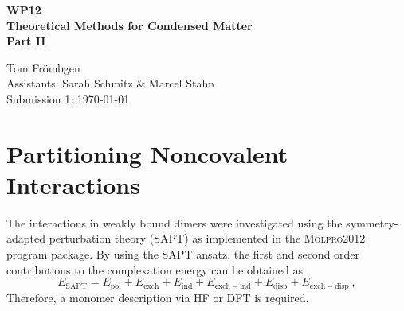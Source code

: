 \documentclass[a4paper,12pt]{scrartcl}
\newcommand{\m}[1]{\mathrm{#1}}
\begin{document}
%
\thispagestyle{empty}

%
\begin{center}
	\begin{LARGE}
		\vspace{50mm}
		\textbf{WP12} \\
		\vspace{15mm}
		\textbf{Theoretical Methods for Condensed Matter} \\
		\vspace{15mm}
		\textbf{Part II} \\
		\vspace{30mm}
	\end{LARGE}
	\begin{large}
		Tom Frömbgen \\
		\vspace{20mm}
		Assistants: Sarah Schmitz \& Marcel Stahn  \\
		\vspace{10mm}
		Submission 1: \today \\
		\vspace{5mm}
	\end{large}
\end{center}

%
\newpage
%
\section{Partitioning Noncovalent Interactions}
%
The interactions in weakly bound dimers were investigated using the symmetry-adapted perturbation theory\autocite{sapt} (SAPT) as implemented in the \textsc{Molpro2012} program package\autocite[]{molpro2012-brief}. By using the SAPT ansatz, the first and second order contributions to the complexation energy can be obtained as
%
\begin{equation}
	E_\m{SAPT} = E_\m{pol} + E_\m{exch} + E_\m{ind} + E_\m{exch-ind} + E_\m{disp} + E_\m{exch-disp}~,
\end{equation}
%
Therefore, a monomer description via HF or DFT is required.
%
\end{document}
